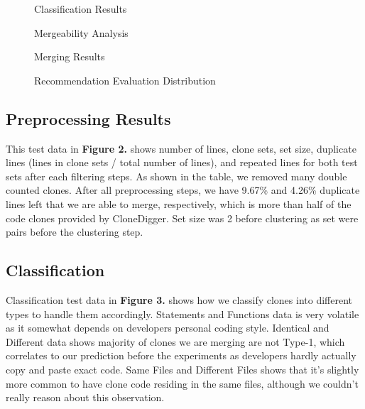 \documentclass{acm_proc_article-sp}
\begin{document}
\begin{figure}
\centering
{}
\caption{Classification Results}
\end{figure}

\begin{figure}
\centering
{}
\caption{Mergeability Analysis}
\end{figure}

\begin{figure}
\centering
{}
\caption{Merging Results}
\end{figure}

\begin{figure}
\centering
{}
\caption{Recommendation Evaluation Distribution}
\end{figure}


\subsection{Preprocessing Results}
This test data in {\bf Figure 2.} shows number of lines, clone sets, set size, duplicate lines (lines in clone sets / total number of lines), and repeated lines for
both test sets after each filtering steps. As shown in the table, we removed many double counted clones. After all preprocessing steps, we have 9.67\% and
4.26\% duplicate lines left that we are able to merge, respectively, which is more than half of the code clones provided by CloneDigger. Set size was 2 before clustering
as set were pairs before the clustering step.

\subsection{Classification}
Classification test data in {\bf Figure 3.} shows how we classify clones into different types to handle them accordingly.
Statements and Functions data is very volatile as it somewhat depends on developers personal coding style.
Identical and Different data shows majority of clones we are merging are not Type-1, which correlates to our prediction
before the experiments as developers hardly actually copy and paste exact code. Same Files and Different Files shows that
it's slightly more common to have clone code residing in the same files, although we couldn't really reason about this observation.
\end{document}
